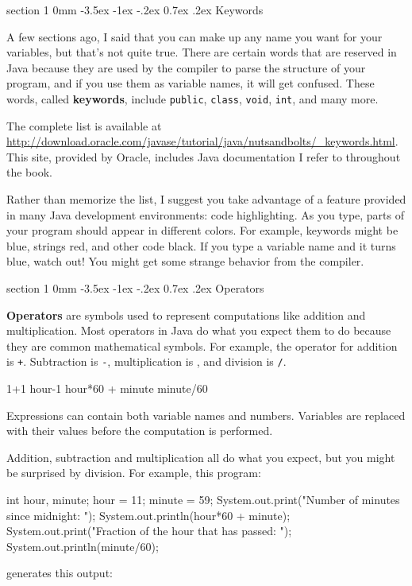 \documentclass{book}
\makeatletter
\renewcommand{\section}{\@startsection 
    {section} {1} {0mm}%
    {-3.5ex \@plus -1ex \@minus -.2ex}%
    {0.7ex \@plus.2ex}%
    {\normalfont\Large\bfseries}}
\makeatother
\begin{document}
\section{Keywords}

A few sections ago, I said that you can make up any name you
want for your variables, but that's not quite true.  There
are certain words that are reserved in Java because they are
used by the compiler to parse the structure of your program,
and if you use them as variable names, it will get confused.
These words, called {\bf keywords}, include {\tt public},
{\tt class}, {\tt void}, {\tt int}, and many more.

The complete list is available at \url{http://download.oracle.com/javase/tutorial/java/nutsandbolts/_keywords.html}.
This site, provided by Oracle, includes Java documentation I refer to
throughout the book.

Rather than memorize the list, I suggest you
take advantage of a feature provided in many Java development
environments: code highlighting.  As you type,
parts of your program should appear in different colors.  For
example, keywords might be blue, strings red, and other code
black.  If you type a variable name and it turns blue, watch
out!  You might get some strange behavior from the compiler.


\section{Operators}

{\bf Operators} are symbols used to represent
computations like addition and multiplication.  Most
operators in Java do what you expect them
to do because they are common mathematical symbols.  For
example, the operator for addition is {\tt +}.  Subtraction
is {\tt -}, multiplication is {\tt *}, and division is {\tt /}.

\begin{verbatimtab}
1+1        hour-1       hour*60 + minute     minute/60
\end{verbatimtab}
%
Expressions can contain both variable
names and numbers.  Variables are
replaced with their values before the computation is performed.


Addition, subtraction and multiplication all do what you
expect, but you might be surprised by division.  For example,
this program:

\begin{verbatimtab}
    int hour, minute;
    hour = 11;
    minute = 59;
    System.out.print("Number of minutes since midnight: ");
    System.out.println(hour*60 + minute);
    System.out.print("Fraction of the hour that has passed: ");
    System.out.println(minute/60);
\end{verbatimtab}
%
generates this output:
\end{document}
